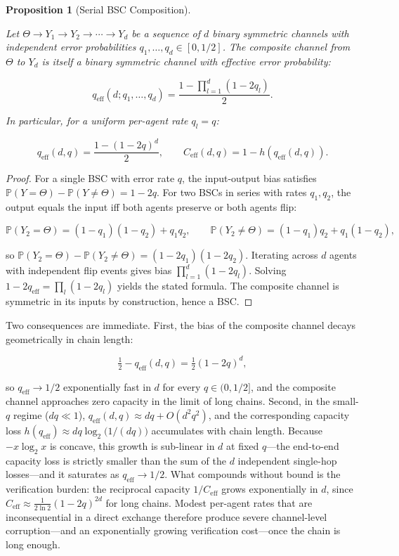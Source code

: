 \documentclass[11pt]{article}
\theoremstyle{plain}
\newtheorem{proposition}[theorem]{Proposition}
\theoremstyle{definition}
\theoremstyle{remark}
\begin{document}
\begin{proposition}[Serial BSC Composition]
\label{prop-bsc-series-depth}

Let $\Theta \to Y_1 \to Y_2 \to \cdots \to Y_d$ be a sequence of $d$ binary symmetric channels with independent error probabilities $q_1, \ldots, q_d \in [0, 1/2]$. The composite channel from $\Theta$ to $Y_d$ is itself a binary symmetric channel with effective error probability:

$$q_{\text{eff}}(d; q_1, \ldots, q_d) = \frac{1 - \prod_{l=1}^{d} (1 - 2 q_l)}{2}.$$

In particular, for a uniform per-agent rate $q_l = q$:

$$q_{\text{eff}}(d, q) = \frac{1 - (1 - 2q)^d}{2}, \qquad C_{\text{eff}}(d, q) = 1 - h(q_{\text{eff}}(d, q)).$$
\end{proposition}

\begin{proof}
For a single BSC with error rate $q$, the input-output bias satisfies $\mathbb{P}(Y = \Theta) - \mathbb{P}(Y \neq \Theta) = 1 - 2q$. For two BSCs in series with rates $q_1, q_2$, the output equals the input iff both agents preserve or both agents flip:

$$\mathbb{P}(Y_2 = \Theta) = (1-q_1)(1-q_2) + q_1 q_2, \qquad \mathbb{P}(Y_2 \neq \Theta) = (1-q_1) q_2 + q_1 (1-q_2),$$

so $\mathbb{P}(Y_2 = \Theta) - \mathbb{P}(Y_2 \neq \Theta) = (1-2q_1)(1-2q_2)$. Iterating across $d$ agents with independent flip events gives bias $\prod_{l=1}^d (1-2q_l)$. Solving $1 - 2 q_{\text{eff}} = \prod_l (1-2q_l)$ yields the stated formula. The composite channel is symmetric in its inputs by construction, hence a BSC.
\end{proof}

Two consequences are immediate. First, the bias of the composite channel
decays geometrically in chain length:

\[\tfrac{1}{2} - q_{\text{eff}}(d, q) = \tfrac{1}{2}(1 - 2q)^d,\]

so \(q_{\text{eff}} \to 1/2\) exponentially fast in \(d\) for every
\(q \in (0, 1/2]\), and the composite channel approaches zero capacity
in the limit of long chains. Second, in the small-\(q\) regime
(\(dq \ll 1\)), \(q_{\text{eff}}(d, q) \approx d q + O(d^2 q^2)\), and
the corresponding capacity loss
\(h(q_{\text{eff}}) \approx d q \log_2\!\big(1/(d q)\big)\) accumulates
with chain length. Because \(-x \log_2 x\) is concave, this growth is
sub-linear in \(d\) at fixed \(q\)---the end-to-end capacity loss is
strictly smaller than the sum of the \(d\) independent single-hop
losses---and it saturates as \(q_{\text{eff}} \to 1/2\). What compounds
without bound is the verification burden: the reciprocal capacity
\(1/C_{\text{eff}}\) grows exponentially in \(d\), since
\(C_{\text{eff}} \approx \tfrac{1}{2 \ln 2}(1 - 2q)^{2d}\) for long
chains. Modest per-agent rates that are inconsequential in a direct
exchange therefore produce severe channel-level corruption---and an
exponentially growing verification cost---once the chain is long enough.
\end{document}
